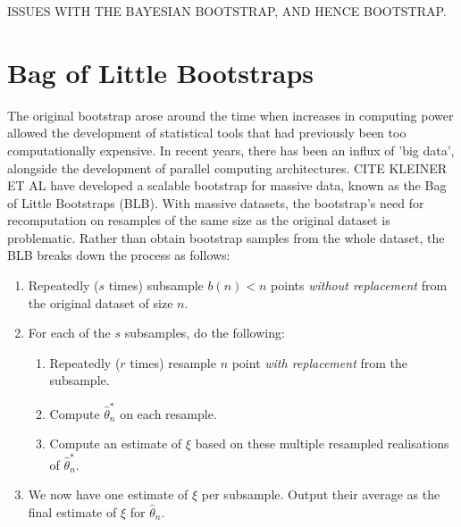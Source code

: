\documentclass{article}\usepackage[]{graphicx}\usepackage[]{color}
\begin{document}
ISSUES WITH THE BAYESIAN BOOTSTRAP, AND HENCE BOOTSTRAP.






\section{Bag of Little Bootstraps}
The original bootstrap arose around the time when increases in computing power allowed the development of statistical tools that had previously been too computationally expensive. In recent years, there has been an influx of 'big data', alongside the development of parallel computing architectures. CITE KLEINER ET AL have developed a scalable bootstrap for massive data, known as the Bag of Little Bootstraps (BLB). With massive datasets, the bootstrap's need for recomputation on resamples of the same size as the original dataset is problematic. Rather than obtain bootstrap samples from the whole dataset, the BLB breaks down the process as follows:

\begin{enumerate}
\item Repeatedly ($s$ times) subsample $b(n) < n$ points \emph{without replacement} from the original dataset of size $n$.
\item For each of the $s$ subsamples, do the following:
\begin{enumerate}
\item Repeatedly ($r$ times) resample $n$ point \emph{with replacement} from the subsample.
\item Compute $\hat\theta_n^*$ on each resample.
\item Compute an estimate of $\xi$ based on these multiple resampled realisations of $\hat\theta_n^*$.
\end{enumerate}
\item We now have one estimate of $\xi$ per subsample. Output their average as the final estimate of $\xi$ for $\hat\theta_n$.
\end{enumerate}
\end{document}
